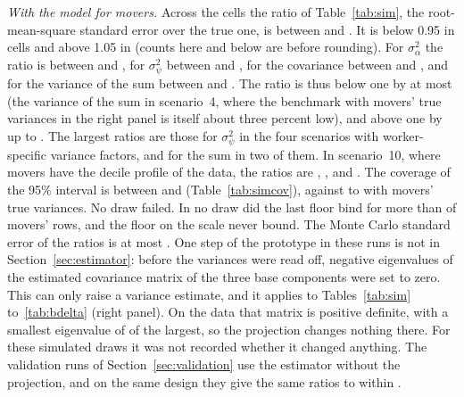\emph{With the model for movers.} Across the  cells the ratio of Table~\ref{tab:sim}, the
root-mean-square standard error over the true one, is between  and . It is below
0.95 in  cells and above 1.05 in  (counts here and below are before
rounding). For $\sigma^2_\alpha$ the ratio is between
 and , for $\sigma^2_\psi$ between  and
, for the covariance between  and , and for the
variance of the sum between  and . The ratio is thus below one
by  at most (the variance of the sum in scenario~4, where the benchmark with movers' true
variances in the right panel is itself about three percent low), and above one by up to . The largest ratios are those for
$\sigma^2_\psi$ in the four scenarios with worker-specific variance factors, and for the sum in two of them. In
scenario~10, where movers have the decile profile of the data, the ratios are , ,
 and . The coverage of the 95\% interval is between  and
 (Table~\ref{tab:simcov}), against  to  with movers' true
variances. No draw failed. In no draw did the last floor bind for more than  of movers'
rows, and the floor on the scale never bound. The Monte Carlo standard error of the ratios is at most . One step of the prototype in
these runs is not in Section~\ref{sec:estimator}: before the variances were read off, negative eigenvalues of the
estimated covariance matrix of the three base components were set to zero. This can only raise a variance
estimate, and it applies to Tables~\ref{tab:sim} to~\ref{tab:bdelta} (right panel). On
the data that matrix is positive definite, with a smallest eigenvalue of  of the largest, so
the projection changes nothing there. For these simulated draws it was not recorded whether it changed
anything. The validation runs of Section~\ref{sec:validation} use the estimator without the projection, and on
the same design they give the same ratios to within .

